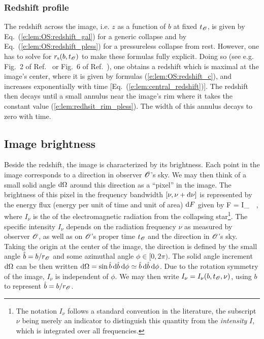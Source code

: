 \subsubsection{Redshift profile}

The redshift across the image, i.e. $z$ as a function of $b$ at fixed $t_{\mathscr{O}}$,
is given by Eq.~(\ref{e:lem:OS:redshift_gal}) for a generic collapse
and by Eq.~(\ref{e:lem:OS:redshift_pless}) for a pressureless collapse
from rest. However, one has to solve for $r_{\rm s}(b, t_{\mathscr{O}})$ to make
these formulas fully explicit. Doing so (see e.g. Fig.~2 of Ref.~\cite{LakeR79} or
Fig.~6 of Ref.~\cite{YoshiTN19}), one obtains a redshift which is maximal
at the image's center, where it is given by formulas (\ref{e:lem:OS:redshift_c}),
and increases exponentially with time [Eq.~(\ref{e:lem:central_redshift})].
The redshift then decays until a small annulus near the image's rim where it
takes the constant value (\ref{e:lem:redhsit_rim_pless}). The width of
this annulus decays to zero with time.


\subsection{Image brightness}

Beside the redshift, the image is characterized by its brightness.
Each point in the image corresponds to a direction in observer $\mathscr{O}$'s sky.
We may then think of a small solid angle $\mathrm{d}\Omega$ around this direction
as a ``pixel'' in the image. The brightness of this pixel
in the frequency bandwidth $[\nu, \nu + \mathrm{d}\nu]$ is represented by the
energy flux (energy per unit of time and unit of area)
$\mathrm{d} F$ given by
\be \label{e:lem:elem_flux}
   \D F = I_\nu \, \D\Omega \, \D\nu ,
\ee
where $I_\nu$ is the 
of the electromagnetic
radiation from the collapsing star\footnote{The notation $I_\nu$ follows
a standard convention in the literature, the subscript $\nu$ being merely an indicator to
distinguish this quantity from the \emph{intensity} $I$, which is integrated over
all frequencies.}.
The specific intensity $I_\nu$
depends on the radiation frequency $\nu$
as measured by observer $\mathscr{O}$, as well
as on $\mathscr{O}$'s proper time $t_{\mathscr{O}}$ and the direction in $\mathscr{O}$'s sky.
Taking the origin at the center of the image, the direction is defined
by the small angle $\hat{b} = b / r_{\mathscr{O}}$ and some azimuthal angle $\phi\in [0,2\pi)$. %
The solid angle increment $\mathrm{d}\Omega$ can be then written
$\mathrm{d} \Omega = \sin\hat{b}\, \mathrm{d}\hat{b}\, \mathrm{d}\phi \simeq \hat{b}\, \mathrm{d}\hat{b}\, \mathrm{d}\phi$.
Due to the rotation symmetry of the image, $I_\nu$ is independent of $\phi$. We may then
write $I_\nu = I_\nu(b, t_{\mathscr{O}}, \nu)$, using $b$ to represent $\hat{b} = b / r_{\mathscr{O}}$.

